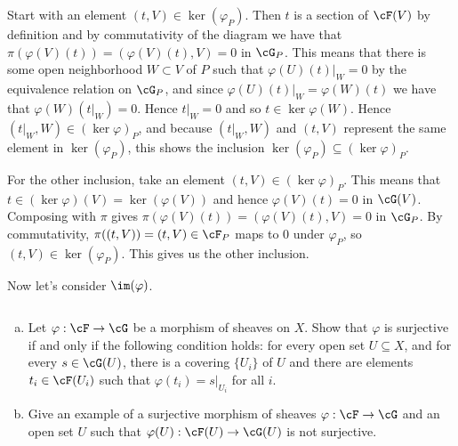 \begin{homework}[e]
\begin{prf}
\begin{enumerate}[(a)]
\begin{center}
				\end{center}
				Start with an element $(t,V) \in \ker (\varphi_P)$. Then $t$ is a section of $\cF(V)$ by definition and by commutativity of the diagram we have that $\pi(\varphi(V)(t)) = (\varphi(V)(t),V) = 0$ in $\cG_P$. This means that there is some open neighborhood $W\subset V$ of $P$ such that $\varphi(U)(t)|_W = 0$ by the equivalence relation on $\cG_P$, and since $\varphi(U)(t)|_W = \varphi(W)(t)$ we have that $\varphi(W)(t|_W) = 0$. Hence $t|_W = 0$ and so $t \in \ker\varphi(W)$. Hence $(t|_W,W) \in (\ker \varphi)_P$, and because $(t|_W,W)$ and $(t,V)$ represent the same element in $\ker (\varphi_P)$, this shows the inclusion $\ker(\varphi_P) \subseteq (\ker \varphi)_P$.

				For the other inclusion, take an element $(t,V) \in (\ker\varphi)_P$. This means that $t \in (\ker\varphi)(V) = \ker(\varphi(V))$ and hence $\varphi(V)(t) = 0$ in $\cG(V)$. Composing with $\pi$ gives $\pi(\varphi(V)(t)) = (\varphi(V)(t),V) = 0$ in $\cG_P$. By commutativity, $\pi((t,V)) = (t,V)\in \cF_P$ maps to $0$ under $\varphi_P$, so $(t,V)\in \ker(\varphi_P)$. This gives us the other inclusion.

				\bigskip

				Now let's consider $\im(\varphi)$.
		\end{enumerate}
	\end{prf}
	\prob $ $
	\begin{enumerate}[(a)]
		\item  Let $\varphi:\cF\to \cG$ be a morphism of sheaves on $X$. Show that $\varphi$ is surjective if and only if the following condition holds: for every open set $U\subseteq X$, and for every $s \in \cG(U)$, there is a covering $\{U_i\}$ of $U$ and there are elements $t_i \in \cF(U_i)$ such that $\varphi(t_i) = s|_{U_i}$ for all $i$.
		\item Give an example of a surjective morphism of sheaves $\varphi:\cF\to \cG$ and an open set $U$ such that $\varphi(U):\cF(U)\to \cG(U)$ is not surjective.
	\end{enumerate}
\end{homework}

